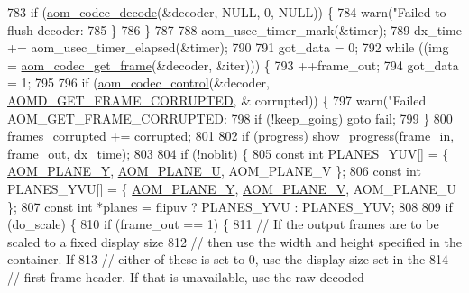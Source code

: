\begin{DoxyCodeInclude}
{{{{{{{{{{{{{{{{{{{{{{{{{{{{{{{{{{{{{{{{{{{{783       \textcolor{keywordflow}{if} (\hyperlink{group__decoder_gab03fdb999d1f83a5896869a3ba5f68f7}{aom\_codec\_decode}(&decoder, NULL, 0, NULL)) \{
784         warn(\textcolor{stringliteral}{"Failed to flush decoder: %
785       \}
786     \}
787 
788     aom\_usec\_timer\_mark(&timer);
789     dx\_time += aom\_usec\_timer\_elapsed(&timer);
790 
791     got\_data = 0;
792     \textcolor{keywordflow}{while} ((img = \hyperlink{group__decoder_ga780aad27a2728abefab725faa3bc4f79}{aom\_codec\_get\_frame}(&decoder, &iter))) \{
793       ++frame\_out;
794       got\_data = 1;
795 
796       \textcolor{keywordflow}{if} (\hyperlink{group__codec_ga6da974f4eeaba1fa74106b28d0fe6ac5}{aom\_codec\_control}(&decoder, \hyperlink{group__aom__decoder_gga3865fd4b3192489baa9a5c3632ebe97ba159ddb748cb69956226b7c13e3890ff6}{AOMD\_GET\_FRAME\_CORRUPTED}, &
      corrupted)) \{
797         warn(\textcolor{stringliteral}{"Failed AOM\_GET\_FRAME\_CORRUPTED: %
798         \textcolor{keywordflow}{if} (!keep\_going) \textcolor{keywordflow}{goto} fail;
799       \}
800       frames\_corrupted += corrupted;
801 
802       \textcolor{keywordflow}{if} (progress) show\_progress(frame\_in, frame\_out, dx\_time);
803 
804       \textcolor{keywordflow}{if} (!noblit) \{
805         \textcolor{keyword}{const} \textcolor{keywordtype}{int} PLANES\_YUV[] = \{ \hyperlink{aom__image_8h_a2ad22076006b15cf809edcaa33f6d339}{AOM\_PLANE\_Y}, \hyperlink{aom__image_8h_a0845e9194541329c0f77b4bd6a38cc7c}{AOM\_PLANE\_U}, AOM\_PLANE\_V \};
806         \textcolor{keyword}{const} \textcolor{keywordtype}{int} PLANES\_YVU[] = \{ \hyperlink{aom__image_8h_a2ad22076006b15cf809edcaa33f6d339}{AOM\_PLANE\_Y}, \hyperlink{aom__image_8h_a32a43f20adb01d846af1925189c37495}{AOM\_PLANE\_V}, AOM\_PLANE\_U \};
807         \textcolor{keyword}{const} \textcolor{keywordtype}{int} *planes = flipuv ? PLANES\_YVU : PLANES\_YUV;
808 
809         \textcolor{keywordflow}{if} (do\_scale) \{
810           \textcolor{keywordflow}{if} (frame\_out == 1) \{
811             \textcolor{comment}{// If the output frames are to be scaled to a fixed display size}
812             \textcolor{comment}{// then use the width and height specified in the container. If}
813             \textcolor{comment}{// either of these is set to 0, use the display size set in the}
814             \textcolor{comment}{// first frame header. If that is unavailable, use the raw decoded}
}}}}}}}}}}}}}}}}}}}}}}}}}}}}}}}}}}}}}}}}}}}}}}
\end{DoxyCodeInclude}
